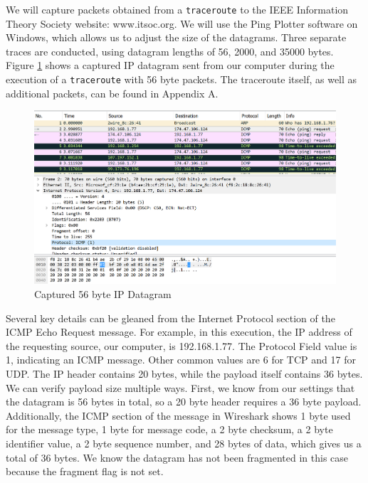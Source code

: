 \documentclass[10pt]{IEEEtran}
\begin{document}
 We will capture packets obtained from a {\tt traceroute} to the IEEE Information Theory Society website: www.itsoc.org. We will use the Ping Plotter software on Windows, which allows us to adjust the size of the datagrams. Three separate traces are conducted, using datagram lengths of 56, 2000, and 35000 bytes. Figure \ref{fig:packet1} shows a captured IP datagram sent from our computer during the execution of a {\tt traceroute} with 56 byte packets. The traceroute itself, as well as additional packets, can be found in Appendix A.\\
 
\begin{figure}[h!]
	\includegraphics[width=\linewidth]{lab2packet1.png}
	\caption{Captured 56 byte IP Datagram}
	\label{fig:packet1}
\end{figure}
 
 Several key details can be gleaned from the Internet Protocol section of the ICMP Echo Request message. For example, in this execution, the IP address of the requesting source, our computer, is 192.168.1.77. The Protocol Field value is 1, indicating an ICMP message. Other common values are 6 for TCP and 17 for UDP. The IP header contains 20 bytes, while the payload itself contains 36 bytes. We can verify payload size multiple ways. First, we know from our settings that the datagram is 56 bytes in total, so a 20 byte header requires a 36 byte payload. Additionally, the ICMP section of the message in Wireshark shows 1 byte used for the message type, 1 byte for message code, a 2 byte checksum, a 2 byte identifier value, a 2 byte sequence number, and 28 bytes of data, which gives us a total of 36 bytes. We know the datagram has not been fragmented in this case because the fragment flag is not set.\\
 
\end{document}

